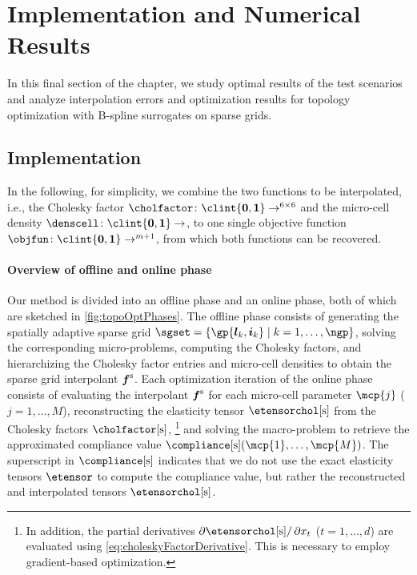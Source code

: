 \section{Implementation and Numerical Results}
\label{sec:64results}


\noindent
In this final section of the chapter,
we study optimal results of the test scenarios and
analyze interpolation errors and optimization results
for topology optimization with B-spline surrogates on sparse grids.



\subsection{Implementation}
\label{sec:641implementation}

In the following, for simplicity,
we combine the two functions to be interpolated,
i.e., the Cholesky factor
$\cholfactor\colon \clint{\*0, \*1} \to \real^{6 \times 6}$ and
the micro-cell density $\denscell\colon \clint{\*0, \*1} \to \real$,
to one single objective function
$\*\objfun\colon \clint{\*0, \*1} \to \real^{m+1}$,
from which both functions can be recovered.

\paragraph{Overview of offline and online phase}

Our method is divided into an offline phase and an online phase,
both of which are sketched in \cref{fig:topoOptPhases}.
The offline phase consists of
generating the spatially adaptive sparse grid
$\sgset = \{\gp{\*l_k,\*i_k} \mid k = 1, \dotsc, \ngp\}$,
solving the corresponding micro-problems,
computing the Cholesky factors, and
hierarchizing the Cholesky factor entries and micro-cell densities
to obtain the sparse grid interpolant $\vsgintp$.
Each optimization iteration of the online phase consists of
evaluating the interpolant $\vsgintp$
for each micro-cell parameter $\mcp{j}$ ($j = 1, \dotsc, M$),
reconstructing the elasticity tensor $\etensorcholintp$ from
the Cholesky factors $\cholfactorintp$,%
\footnote{%
  In addition, the partial derivatives
  $\partialdiff{} \etensorcholintp/\partialdiff{} x_t$
  ($t = 1, \dotsc, d$)
  are evaluated using \cref{eq:choleskyFactorDerivative}.
  This is necessary to employ gradient-based optimization.%
}
and solving the macro-problem to retrieve the approximated compliance value
$\complianceintp(\mcp{1}, \dotsc, \mcp{M})$.
The superscript in $\complianceintp$ indicates that
we do not use the exact elasticity tensors $\etensor$
to compute the compliance value,
but rather the reconstructed and interpolated tensors
$\etensorcholintp$.

